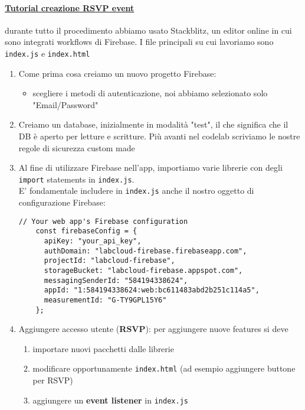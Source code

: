\paragraph{\href{https://firebase.google.com/codelabs/firebase-get-to-know-web#0}{Tutorial creazione RSVP event}} durante tutto il procedimento abbiamo usato Stackblitz, un editor online in cui sono integrati workflows di Firebase. I file principali su cui lavoriamo sono \verb|index.js| e \verb|index.html|
\begin{enumerate}
    \item Come prima cosa creiamo un nuovo progetto Firebase:
    \begin{itemize}
        \item scegliere i metodi di autenticazione, noi abbiamo selezionato solo "Email/Password"
    \end{itemize}
    
    \item Creiamo un database, inizialmente in modalità "test", il che significa che il DB è aperto per letture e scritture. Più avanti nel codelab scriviamo le nostre regole di sicurezza custom made
    
    \item Al fine di utilizzare Firebase nell'app, importiamo varie librerie con degli \verb|import| statements in \verb|index.js|.\\
    E' fondamentale includere in \verb|index.js| anche il nostro oggetto di configurazione Firebase:
    \begin{lstlisting}[languague=Javascript]
    // Your web app's Firebase configuration
    const firebaseConfig = {
      apiKey: "your_api_key",
      authDomain: "labcloud-firebase.firebaseapp.com",
      projectId: "labcloud-firebase",
      storageBucket: "labcloud-firebase.appspot.com",
      messagingSenderId: "584194338624",
      appId: "1:584194338624:web:bc611483abd2b251c114a5",
      measurementId: "G-TY9GPL15Y6"
    };
    \end{lstlisting}

    \item Aggiungere accesso utente (\textbf{RSVP}): per aggiungere nuove features si deve
    \begin{enumerate}
        \item importare nuovi pacchetti dalle librerie
        \item modificare opportunamente \verb|index.html| (ad esempio aggiungere buttone per RSVP)
        \item aggiungere un \textbf{event listener} in \verb|index.js|
    \end{enumerate}
    

\end{enumerate}
